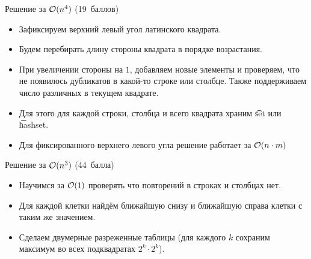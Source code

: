 \begin{frame}{Решение за $\mathcal{O}(n ^ 4)$ (19~баллов)}
  \vspace{-0.7em}
  \begin{itemize}
  \item Зафиксируем верхний левый угол латинского квадрата.
  \item Будем перебирать длину стороны квадрата в порядке возрастания.
  \item При увеличении стороны на $1$, добавляем новые элементы и проверяем, что не появилось дубликатов в какой-то строке или столбце.
    Также поддерживаем число различных в текущем квадрате.
  \item Для этого для каждой строки, столбца и всего квадрата храним \t{set} или \t{hashset}.
  \item Для фиксированного верхнего левого угла решение работает за $\mathcal{O}(n \cdot m)$
  \end{itemize}
\end{frame}


\begin{frame}{Решение за $\mathcal{O}(n ^ 3)$ (44~балла)}
  \begin{itemize}
  \item Научимся за $\mathcal{O}(1)$ проверять что повторений в строках и столбцах нет.
  \item Для каждой клетки найдём ближайшую снизу и ближайшую справа клетки с таким же значением.
  \item Сделаем двумерные разреженные таблицы (для каждого $k$ сохраним максимум во всех подквадратах $2^k \cdot 2^k$).
  \end{itemize}
\end{frame}


